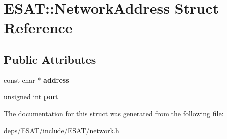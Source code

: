 \hypertarget{struct_e_s_a_t_1_1_network_address}{}\section{E\+S\+AT\+:\+:Network\+Address Struct Reference}
\label{struct_e_s_a_t_1_1_network_address}
\subsection*{Public Attributes}
\begin{DoxyCompactItemize}
\item 
\mbox{\label{struct_e_s_a_t_1_1_network_address_a2beb3caf9819e39fbe2c1cdad89d27ca}} 
const char $\ast$ {\bfseries address}
\item 
\mbox{\label{struct_e_s_a_t_1_1_network_address_a31d1014be107d088f28b503c32b68612}} 
unsigned int {\bfseries port}
\end{DoxyCompactItemize}


The documentation for this struct was generated from the following file\+:\begin{DoxyCompactItemize}
\item 
deps/\+E\+S\+A\+T/include/\+E\+S\+A\+T/network.\+h\end{DoxyCompactItemize}
